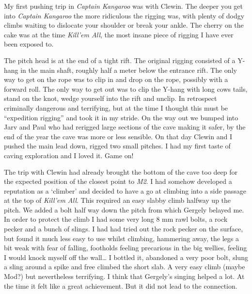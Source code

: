 My first pushing trip in \emph{Captain Kangaroo} was with Clewin. The
deeper you get into \emph{Captain Kangaroo} the more ridiculous the
rigging was, with plenty of dodgy climbs waiting to dislocate your
shoulder or break your ankle. The cherry on the cake was at the time
\emph{Kill'em All}, the most insane piece of rigging I have ever been
exposed to.

The pitch head is at the end of a tight rift. The original rigging
consisted of a Y-hang in the main shaft, roughly half a meter below the
entrance rift. The only way to get on the rope was to clip in and drop
on the rope, possibly with a forward roll. The only way to get out was
to clip the Y-hang with long cows tails, stand on the knot, wedge
yourself into the rift and unclip. In retrospect criminally dangerous
and terrifying, but at the time I thought this must be ``expedition
rigging'' and took it in my stride. On the way out we bumped into Jarv
and Paul who had rerigged large sections of the cave making it safer, by
the end of the year the cave was more or less sensible. On that day
Clewin and I pushed the main lead down, rigged two small pitches. I had
my first taste of caving exploration and I loved it. Game on!

The trip with Clewin had already brought the bottom of the cave too deep
for the expected position of the closest point to \emph{M2}. I had
somehow developed a reputation as a `climber' and decided to have a go
at climbing into a side passage at the top of \emph{Kill'em All}. This
required an easy slabby climb halfway up the pitch. We added a bolt half
way down the pitch from which Gergely belayed me. In order to protect
the climb I had some very long 8 mm rawl bolts, a rock pecker and a
bunch of slings. I had had tried out the rock pecker on the surface, but
found it much less easy to use whilst climbing, hammering away, the legs
a bit weak with fear of falling, footholds feeling precarious in the big
wellies, feeling I would knock myself off the wall\ldots{} I bottled it,
abandoned a very poor bolt, slung a sling around a spike and free
climbed the short slab. A very easy climb (maybe Mod?) but nevertheless
terrifying. I think that Gergely's singing helped a lot. At the time it
felt like a great achievement. But it did not lead to the connection.

